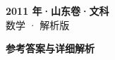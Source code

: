 \documentclass[zihao=-4, a4paper]{ctexart}
\begin{document}
\begin{center}
  {\Large\bfseries 2011 年·山东卷·文科}\\[4pt]
  {\large 数学 · 解析版}
\end{center}
\medskip
{}

\clearpage
{}
\begin{center}{\Large\bfseries 参考答案与详细解析}\end{center}
\medskip

\end{document}
